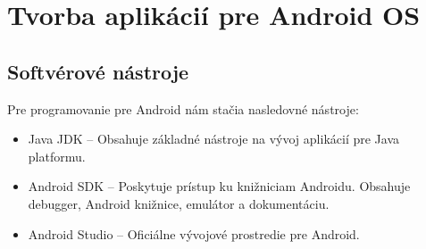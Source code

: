 \documentclass{template/socthesis}
\begin{document}
\section{Tvorba aplikácií pre Android OS}
\subsection*{Softvérové nástroje}
Pre programovanie pre Android nám stačia nasledovné nástroje:
\begin{itemize}
	\item Java JDK -- Obsahuje základné nástroje na vývoj aplikácií pre Java platformu.
	\item Android SDK -- Poskytuje prístup ku knižniciam Androidu. Obsahuje debugger, Android knižnice, emulátor a dokumentáciu. 
	\item Android Studio -- Oficiálne vývojové prostredie pre Android. 
\end{itemize}
\end{document}
